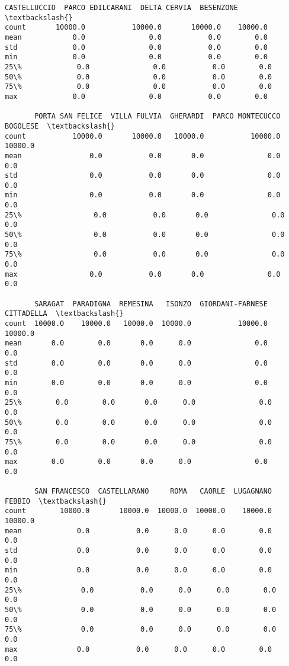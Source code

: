 \documentclass[11pt]{article}
\makeatletter
\newcommand{\boxspacing}{\kern\kvtcb@left@rule\kern\kvtcb@boxsep}
\newcommand{\prompt}[4]{
        {\ttfamily\llap{{\color{#2}[#3]:\hspace{3pt}#4}}\vspace{-\baselineskip}}
    }
\makeatother
\begin{document}
            \begin{tcolorbox}[breakable, size=fbox, boxrule=.5pt, pad at break*=1mm, opacityfill=0]
\prompt{Out}{outcolor}{27}{\boxspacing}
\begin{Verbatim}[commandchars=\\\{\}]
       CASTELLUCCIO  PARCO EDILCARANI  DELTA CERVIA  BESENZONE  \textbackslash{}
count       10000.0           10000.0       10000.0    10000.0
mean            0.0               0.0           0.0        0.0
std             0.0               0.0           0.0        0.0
min             0.0               0.0           0.0        0.0
25\%             0.0               0.0           0.0        0.0
50\%             0.0               0.0           0.0        0.0
75\%             0.0               0.0           0.0        0.0
max             0.0               0.0           0.0        0.0

       PORTA SAN FELICE  VILLA FULVIA  GHERARDI  PARCO MONTECUCCO  BOGOLESE  \textbackslash{}
count           10000.0       10000.0   10000.0           10000.0   10000.0
mean                0.0           0.0       0.0               0.0       0.0
std                 0.0           0.0       0.0               0.0       0.0
min                 0.0           0.0       0.0               0.0       0.0
25\%                 0.0           0.0       0.0               0.0       0.0
50\%                 0.0           0.0       0.0               0.0       0.0
75\%                 0.0           0.0       0.0               0.0       0.0
max                 0.0           0.0       0.0               0.0       0.0

       SARAGAT  PARADIGNA  REMESINA   ISONZO  GIORDANI-FARNESE  CITTADELLA  \textbackslash{}
count  10000.0    10000.0   10000.0  10000.0           10000.0     10000.0
mean       0.0        0.0       0.0      0.0               0.0         0.0
std        0.0        0.0       0.0      0.0               0.0         0.0
min        0.0        0.0       0.0      0.0               0.0         0.0
25\%        0.0        0.0       0.0      0.0               0.0         0.0
50\%        0.0        0.0       0.0      0.0               0.0         0.0
75\%        0.0        0.0       0.0      0.0               0.0         0.0
max        0.0        0.0       0.0      0.0               0.0         0.0

       SAN FRANCESCO  CASTELLARANO     ROMA   CAORLE  LUGAGNANO   FEBBIO  \textbackslash{}
count        10000.0       10000.0  10000.0  10000.0    10000.0  10000.0
mean             0.0           0.0      0.0      0.0        0.0      0.0
std              0.0           0.0      0.0      0.0        0.0      0.0
min              0.0           0.0      0.0      0.0        0.0      0.0
25\%              0.0           0.0      0.0      0.0        0.0      0.0
50\%              0.0           0.0      0.0      0.0        0.0      0.0
75\%              0.0           0.0      0.0      0.0        0.0      0.0
max              0.0           0.0      0.0      0.0        0.0      0.0


\end{Verbatim}
\end{tcolorbox}
\end{document}
